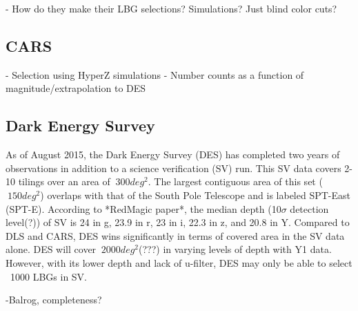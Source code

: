 \documentclass[12pt]{article}
\begin{document}
 - How do they make their LBG selections? Simulations? Just blind color cuts?

\subsection{CARS}

- Selection using HyperZ simulations
- Number counts as a function of magnitude/extrapolation to DES


\subsection{Dark Energy Survey}
As of August 2015, the Dark Energy Survey (DES) has completed two years of observations in addition to a science verification (SV) run.
This SV data covers 2-10 tilings over an area of $~300 deg^{2}$. 
The largest contiguous area of this set ($~150 deg^{2}$) overlaps with that of the South Pole Telescope and is labeled SPT-East (SPT-E).
According to *RedMagic paper*, the median depth (10$\sigma$ detection level(?)) of SV is 24 in g, 23.9 in r, 23 in i, 22.3 in z, and 20.8 in Y.
Compared to DLS and CARS, DES wins significantly in terms of covered area in the SV data alone. 
DES will cover $~2000 deg^{2}$(???) in varying levels of depth with Y1 data.
However, with its lower depth and lack of u-filter, DES may only be able to select ~1000 LBGs in SV. 

-Balrog, completeness?



\end{document}

